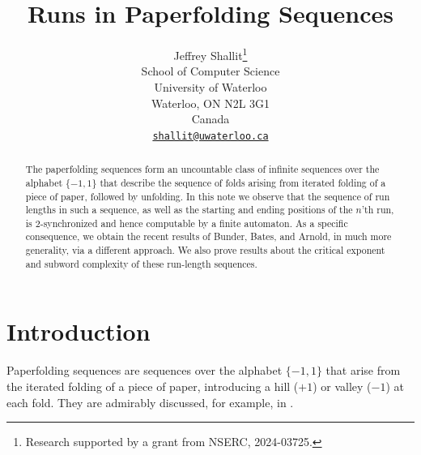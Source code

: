 \documentclass[12pt,reqno]{article}
\begin{document}
\theoremstyle{plain}
\newtheorem{theorem}{Theorem}
\newtheorem{corollary}[theorem]{Corollary}
\newtheorem{lemma}[theorem]{Lemma}
\newtheorem{proposition}[theorem]{Proposition}

\theoremstyle{definition}
\newtheorem{definition}[theorem]{Definition}
\newtheorem{example}[theorem]{Example}
\newtheorem{conjecture}[theorem]{Conjecture}

\theoremstyle{remark}
\newtheorem{remark}[theorem]{Remark}

\title{Runs in Paperfolding Sequences}

\author{Jeffrey Shallit\footnote{Research supported by a grant from NSERC,
2024-03725.}\\
School of Computer Science\\
University of Waterloo\\
Waterloo, ON N2L 3G1 \\
Canada\\
\href{mailto:shallit@uwaterloo.ca}{\tt shallit@uwaterloo.ca}}

\maketitle

\begin{abstract}
The paperfolding sequences form an uncountable class of infinite
sequences over the alphabet $\{ -1, 1 \}$ that describe the sequence
of folds arising from iterated folding of a piece of paper,
followed by unfolding. In this note we observe that the sequence
of run lengths in such a sequence, as well as the starting and 
ending positions of the $n$'th run,
is $2$-synchronized and hence computable by a finite automaton.
As a specific consequence, we obtain the recent results of Bunder, Bates, and
Arnold, in much more generality, via a different approach.  We also prove results about the
critical exponent and subword complexity of these run-length sequences.
\end{abstract}

\section{Introduction}

Paperfolding sequences are sequences over the alphabet
$\{ -1, 1\}$ that arise from the iterated folding of a piece of paper,
introducing a hill ($+1$) or valley ($-1$) at each fold.  They are
admirably discussed, for example, in \cite{Davis&Knuth:1970,Dekking&MendesFrance&vanderPoorten:1982}.
\end{document}
